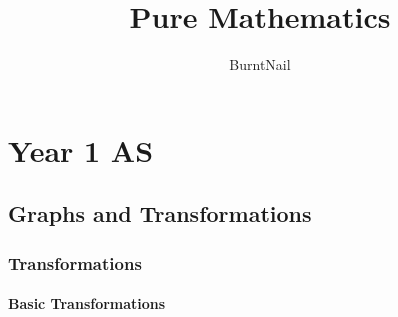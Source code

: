 \documentclass{report}
\title{\huge{Pure Mathematics}}
\author{\huge{BurntNail}}
\date{}
\begin{document}
	
\maketitle
\tableofcontents
\pagebreak

\part{Year 1 AS}
\chapter{Graphs and Transformations}
\section{Transformations}
\subsection{Basic Transformations}
\end{document}
